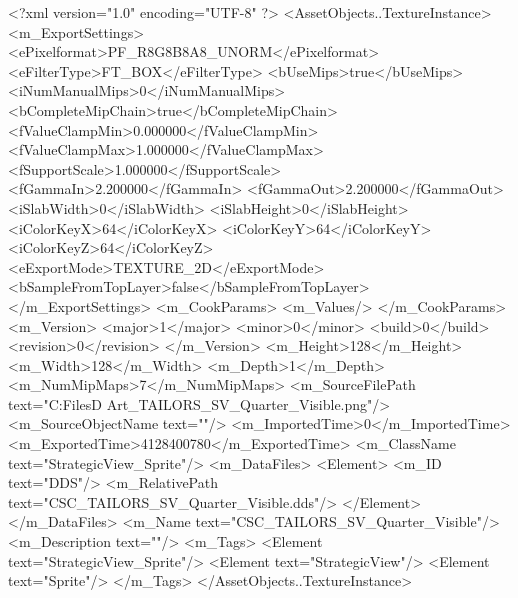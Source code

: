 <?xml version="1.0" encoding="UTF-8" ?>
<AssetObjects..TextureInstance>
	<m_ExportSettings>
		<ePixelformat>PF_R8G8B8A8_UNORM</ePixelformat>
		<eFilterType>FT_BOX</eFilterType>
		<bUseMips>true</bUseMips>
		<iNumManualMips>0</iNumManualMips>
		<bCompleteMipChain>true</bCompleteMipChain>
		<fValueClampMin>0.000000</fValueClampMin>
		<fValueClampMax>1.000000</fValueClampMax>
		<fSupportScale>1.000000</fSupportScale>
		<fGammaIn>2.200000</fGammaIn>
		<fGammaOut>2.200000</fGammaOut>
		<iSlabWidth>0</iSlabWidth>
		<iSlabHeight>0</iSlabHeight>
		<iColorKeyX>64</iColorKeyX>
		<iColorKeyY>64</iColorKeyY>
		<iColorKeyZ>64</iColorKeyZ>
		<eExportMode>TEXTURE_2D</eExportMode>
		<bSampleFromTopLayer>false</bSampleFromTopLayer>
	</m_ExportSettings>
	<m_CookParams>
		<m_Values/>
	</m_CookParams>
	<m_Version>
		<major>1</major>
		<minor>0</minor>
		<build>0</build>
		<revision>0</revision>
	</m_Version>
	<m_Height>128</m_Height>
	<m_Width>128</m_Width>
	<m_Depth>1</m_Depth>
	<m_NumMipMaps>7</m_NumMipMaps>
	<m_SourceFilePath text="C:\Users\Shadow\Desktop\Working Files\2D Art\Quarters\Tailors\StrategicView\CSC_TAILORS_SV_Quarter_Visible.png"/>
	<m_SourceObjectName text=""/>
	<m_ImportedTime>0</m_ImportedTime>
	<m_ExportedTime>4128400780</m_ExportedTime>
	<m_ClassName text="StrategicView_Sprite"/>
	<m_DataFiles>
		<Element>
			<m_ID text="DDS"/>
			<m_RelativePath text="CSC_TAILORS_SV_Quarter_Visible.dds"/>
		</Element>
	</m_DataFiles>
	<m_Name text="CSC_TAILORS_SV_Quarter_Visible"/>
	<m_Description text=""/>
	<m_Tags>
		<Element text="StrategicView_Sprite"/>
		<Element text="StrategicView"/>
		<Element text="Sprite"/>
	</m_Tags>
</AssetObjects..TextureInstance>

